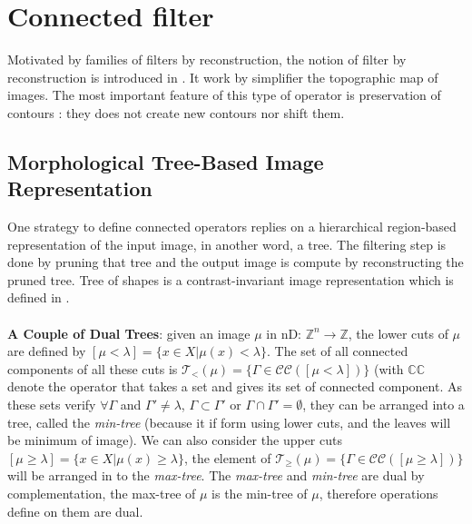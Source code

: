 \documentclass[12pt,a4paper]{report}
\begin{document}
\section{Connected filter}
Motivated by families of filters by reconstruction, the notion of filter by reconstruction is introduced in \cite{Salembier95flatzones} \cite{Serra1993}. It work by simplifier the topographic map of images. The most important feature of this type of operator is preservation of contours \cite{Salembier2009}: they does not create new contours nor shift them.
\subsection{Morphological Tree-Based Image Representation}
One strategy to define connected operators replies on a hierarchical region-based representation of the input image, in another word, a tree. The filtering step is done by pruning that tree and the output image is compute by reconstructing the pruned tree.  Tree of shapes is a contrast-invariant image representation which is defined in \cite{Monasse.2000}.
\paragraph{} \textbf{A Couple of Dual Trees}: given an image $\mu $ in nD: $\mathbb{Z}^{n} \rightarrow \mathbb{Z} $, the lower cuts of $\mu$ are defined by 
	$[\mu < \lambda] =\lbrace x \in X \vert \mu (x) < \lambda \rbrace $. The set of all connected components of all these cuts is $ \mathcal{T}_< (\mu) =\lbrace \Gamma \in \mathcal{C}\mathcal{C}([\mu < \lambda]) \rbrace $ (with $\mathbb{C}\mathbb{C}$ denote the operator that takes a set and gives its set of connected component. As these sets verify $\forall \Gamma$ and $\Gamma ' \neq \lambda$, $\Gamma \subset \Gamma ' $ or $\Gamma \cap \Gamma '= \emptyset$, they can be arranged into a tree, called the \textit{min-tree} (because it if form using lower cuts, and the leaves will be minimum of image). We can also consider the upper cuts $[\mu \geq \lambda] =\lbrace x \in X \vert \mu (x) \geq \lambda \rbrace $, the element of $ \mathcal{T}_\geq (\mu) =\lbrace \Gamma \in \mathcal{C}\mathcal{C}([\mu \geq \lambda]) \rbrace $ will be arranged in to the \textit{max-tree}. The \textit{max-tree} and \textit{min-tree} are dual by complementation, the max-tree of $\mu$ is the min-tree of $ \mu$, therefore operations define on them are dual.
\end{document}
